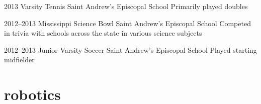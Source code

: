 \documentclass[]{friggeri-cv} %
\begin{document}
\begin{entrylist}

	\entry
	{2013}
	{Varsity Tennis}
	{Saint Andrew's Episcopal School}
	{Primarily played doubles}


	\entry
	{2012--2013}
	{Mississippi Science Bowl}
	{Saint Andrew's Episcopal School}
	{Competed in trivia with schools across the state in various science subjects}


	\entry
	{2012--2013}
	{Junior Varsity Soccer}
	{Saint Andrew's Episcopal School}
	{Played starting midfielder}

\end{entrylist}


\pagebreak 

\section{robotics}
\end{document}
